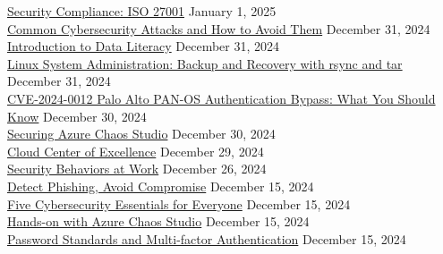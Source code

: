 \documentclass[10pt]{res} %
\begin{document}
\begin{resume}
\href{https://bjdelacruz.dev/files/certificates/pluralsight/Security_Compliance_-_ISO_27001.pdf}{\color{blue}Security Compliance: ISO 27001} \hfill January 1, 2025 \\
\href{https://bjdelacruz.dev/files/certificates/pluralsight/Common_Cybersecurity_Attacks_and_How_to_Avoid_Them.pdf}{\color{blue}Common Cybersecurity Attacks and How to Avoid Them} \hfill December 31, 2024 \\
\href{https://bjdelacruz.dev/files/certificates/pluralsight/Introduction_to_Data_Literacy.pdf}{\color{blue}Introduction to Data Literacy} \hfill December 31, 2024 \\
\href{https://bjdelacruz.dev/files/certificates/pluralsight/Linux_System_Administration_-_Backup_and_Recovery_with_rsync_and_tar.pdf}{\color{blue}Linux System Administration: Backup and Recovery with rsync and tar} \hfill December 31, 2024 \\
\href{https://bjdelacruz.dev/files/certificates/pluralsight/CVE-2024-0012_Palo_Alto_PAN-OS_Authentication_Bypass_-_What_You_Should_Know.pdf}{\color{blue}CVE-2024-0012 Palo Alto PAN-OS Authentication Bypass: What You Should Know} \hfill December 30, 2024 \\
\href{https://bjdelacruz.dev/files/certificates/pluralsight/Securing_Azure_Chaos_Studio.pdf}{\color{blue}Securing Azure Chaos Studio} \hfill December 30, 2024 \\
\href{https://bjdelacruz.dev/files/certificates/pluralsight/Cloud_Center_of_Excellence.pdf}{\color{blue}Cloud Center of Excellence} \hfill December 29, 2024 \\
\href{https://bjdelacruz.dev/files/certificates/pluralsight/Security_Behaviors_at_Work.pdf}{\color{blue}Security Behaviors at Work} \hfill December 26, 2024 \\
\href{https://bjdelacruz.dev/files/certificates/pluralsight/Detect_Phishing_Avoid_Compromise.pdf}{\color{blue}Detect Phishing, Avoid Compromise} \hfill December 15, 2024 \\
\href{https://bjdelacruz.dev/files/certificates/pluralsight/Five_Cybersecurity_Essentials_for_Everyone.pdf}{\color{blue}Five Cybersecurity Essentials for Everyone} \hfill December 15, 2024 \\
\href{https://bjdelacruz.dev/files/certificates/pluralsight/Hands-on_with_Azure_Chaos_Studio.pdf}{\color{blue}Hands-on with Azure Chaos Studio} \hfill December 15, 2024 \\
\href{https://bjdelacruz.dev/files/certificates/pluralsight/Password_Standards_and_Multi-factor_Authentication.pdf}{\color{blue}Password Standards and Multi-factor Authentication} \hfill December 15, 2024 \\

\end{resume}
\end{document}
